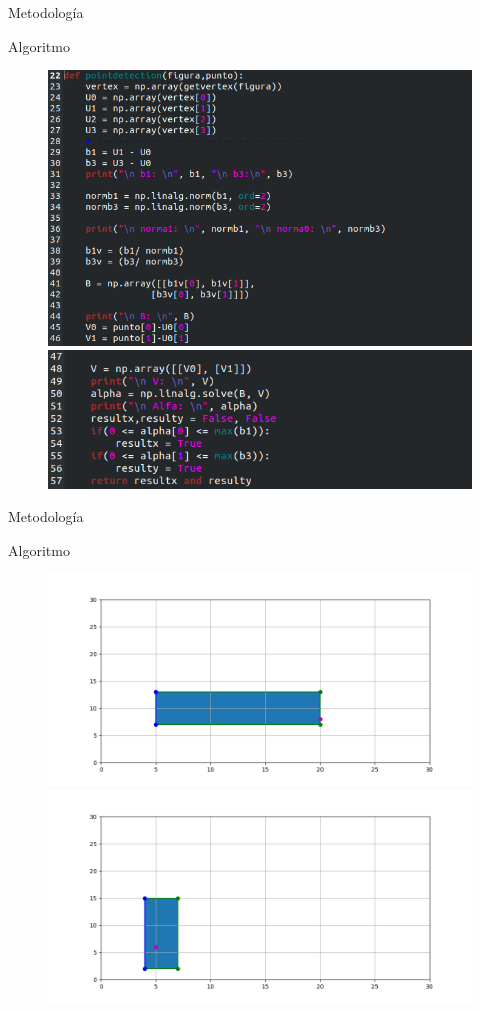 \documentclass[11pt]{beamer}
\begin{document}
\begin{frame}{Metodología}
 \begin{block}{Algoritmo}
\begin{figure}
 \includegraphics[width = 0.6\linewidth]{img/Contact_detection}
 \includegraphics[width = 0.6\linewidth]{img/Contact_detection2}
\end{figure}
 \end{block}
\end{frame}

\begin{frame}{Metodología}
 \begin{block}{Algoritmo}
\begin{figure}
 \includegraphics[width = 0.6\linewidth]{img/Figura_arista}
 \includegraphics[width = 0.6\linewidth]{img/Figura_dentro}
\end{figure}
 \end{block}
\end{frame}
\end{document}
